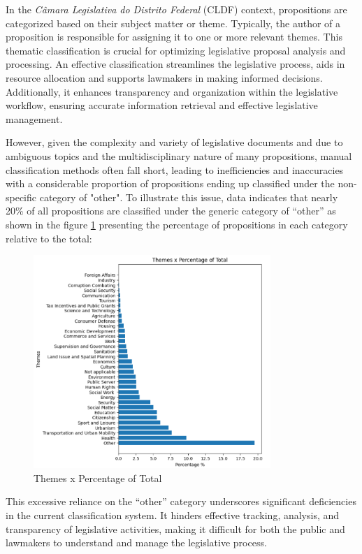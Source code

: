 \documentclass[12pt]{article}
\begin{document}
In the \emph{Câmara Legislativa do Distrito Federal} (CLDF) context, propositions are categorized based on their subject matter or theme. Typically, the author of a proposition is responsible for assigning it to one or more relevant themes. This thematic classification is crucial for optimizing legislative proposal analysis and processing. An effective classification streamlines the legislative process, aids in resource allocation and supports lawmakers in making informed decisions. Additionally, it enhances transparency and organization within the legislative workflow, ensuring accurate information retrieval and effective legislative management.

However, given the complexity and variety of legislative documents and due to ambiguous topics and the multidisciplinary nature of many propositions, manual classification methods often fall short, leading to inefficiencies and inaccuracies with a considerable proportion of propositions ending up classified under the non-specific category of "other". To illustrate this issue, data indicates that nearly 20\% of all propositions are classified under the generic category of ``other'' as shown in the figure \ref{fig:themes} presenting the percentage of propositions in each category relative to the total:


\begin{figure}[ht]
	\centering
	\includegraphics[width=0.8\textwidth]{fig/graphThemesPercentage.png}
	\caption{Themes x Percentage of Total}
	\label{fig:themes}
\end{figure}

This excessive reliance on the ``other'' category underscores significant deficiencies in the current classification system. It hinders effective tracking, analysis, and transparency of legislative activities, making it difficult for both the public and lawmakers to understand and manage the legislative process.
\end{document}
